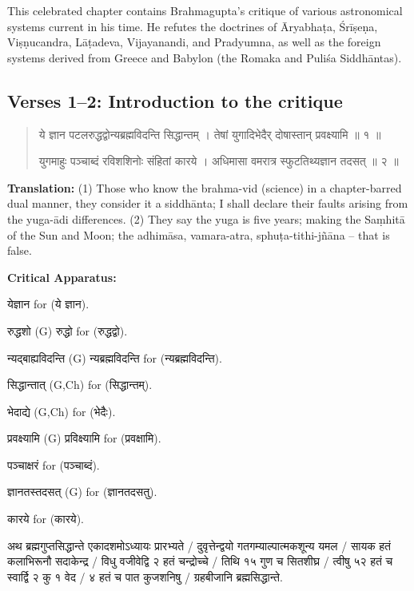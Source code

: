 \documentclass[11pt,a4paper]{article}
\newcommand{\dev}[1]{{\devanagarifont #1}}
\newenvironment{sanskritverse}{%
  \begin{quote}%
  \devanagarifont%
  \setlength{\leftmargin}{2em}%
}{\end{quote}}
\newenvironment{variants}{%
  \small%
  \color{varecolor}%
  \list{}{\leftmargin=2em\itemindent=-1em}%
}{\endlist}
\begin{document}
This celebrated chapter contains Brahmagupta's critique of various astronomical 
systems current in his time. He refutes the doctrines of Āryabhaṭa, Śrīṣeṇa, 
Viṣṇucandra, Lāṭadeva, Vijayanandi, and Pradyumna, as well as the foreign systems 
derived from Greece and Babylon (the Romaka and Puliśa Siddhāntas).

\subsection*{Verses 1--2: Introduction to the critique}

\begin{sanskritverse}
\dev{ये ज्ञान पटलरुद्धद्वोन्यब्रह्मविदन्ति सिद्धान्तम्} ।
\dev{तेषां युगादिभेदैर् दोषास्तान् प्रवक्ष्यामि ॥ १ ॥}

\dev{युगमाहुः पञ्चाब्दं रविशशिनोः संहितां कारये} ।
\dev{अधिमासा वमरात्र स्फुटतिथ्यज्ञान तदसत् ॥ २ ॥}
\end{sanskritverse}

\textbf{Translation:} (1) Those who know the brahma-vid (science) in a chapter-barred 
dual manner, they consider it a siddhānta; I shall declare their faults arising from 
the yuga-ādi differences. (2) They say the yuga is five years; making the Saṃhitā 
of the Sun and Moon; the adhimāsa, vamara-atra, sphuṭa-tithi-jñāna -- that is false.

\textcolor{varecolor}{\textbf{Critical Apparatus:}}
\begin{variants}
\item[1.1] \dev{येज्ञान} \dev{for} (\dev{ये ज्ञान}).
\item[1.2] \dev{रुद्धशो} (G) \dev{रुद्धो} \dev{for} (\dev{रुद्धद्वो}).
\item[1.3] \dev{न्यद्बाह्यविदन्ति} (G) \dev{न्यब्रह्मविदन्ति} \dev{for} (\dev{न्यब्रह्मविदन्ति}).
\item[1.4] \dev{सिद्धान्तात्} (G,Ch) \dev{for} (\dev{सिद्धान्तम्}).
\item[1.5] \dev{भेदाद्ये} (G,Ch) \dev{for} (\dev{भेदैः}).
\item[1.6] \dev{प्रवक्ष्यामि} (G) \dev{प्रविक्ष्यामि} \dev{for} (\dev{प्रवक्षामि}).
\item[2.1] \dev{पञ्चाक्षरं} \dev{for} (\dev{पञ्चाब्दं}).
\item[2.2] \dev{ज्ञानतस्तदसत्} (G) \dev{for} (\dev{ज्ञानतदसतु}).
\item[2.3] \dev{कारये} \dev{for} (\dev{कारये}).
\item[\dev{वि०--अतिरिक्त पाठः}] \dev{अथ ब्रह्मगुप्तसिद्धान्ते एकादशमोऽध्यायः प्रारभ्यते} / 
\dev{दुवृत्तेन्द्वयो गतगम्याल्पात्मकशून्य यमल} / 
\dev{सायक हतं कलाभिरूनौ सदाकेन्द्र} / \dev{विधु वजीवेद्वि २ हतं चन्द्रोच्चे} / 
\dev{तिथि १५ गुण च सितशीघ्र} / \dev{त्वीषु ५२ हतं च स्वार्द्वि २ कु १ वेद} / 
\dev{४ हतं च पात कुजशनिषु} / \dev{ग्रहबीजानि ब्रह्मसिद्धान्ते}.
\end{variants}
\end{document}
